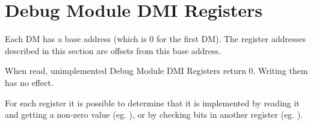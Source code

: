 \section{Debug Module DMI Registers} \label{dmdebbus}

Each DM has a base address (which is 0 for the first DM). The register
addresses described in this section are offsets from this base address.

When read, unimplemented Debug Module DMI Registers return 0. Writing them has
no effect.

For each register it is possible to determine that it is implemented by reading
it and getting a non-zero value (eg. \Rsbcs), or by checking bits in another
register (eg. \Fprogbufsize).


